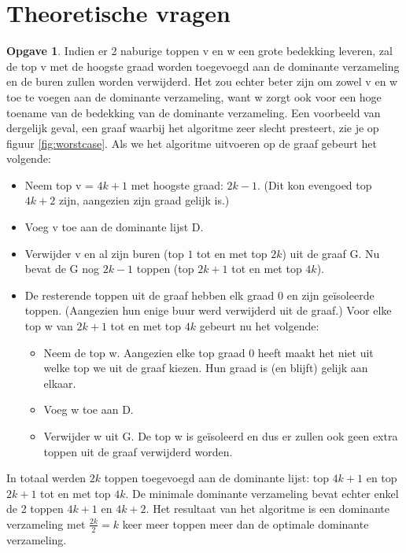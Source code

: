 \documentclass[11pt, a4paper, table]{article}
\theoremstyle{definition}
\newtheorem{opgave}{Opgave}
\theoremstyle{definition}
\theoremstyle{definition}
\begin{document}
\section{Theoretische vragen}
\begin{opgave}
	Indien er 2 naburige toppen v en w een grote bedekking leveren, zal de top v met de hoogste graad worden toegevoegd aan de dominante verzameling en de buren zullen worden verwijderd. Het zou echter beter zijn om zowel v en w toe te voegen aan de dominante verzameling, want w zorgt ook voor een hoge toename van de bedekking van de dominante verzameling. 
	Een voorbeeld van dergelijk geval, een graaf waarbij het algoritme zeer slecht presteert, zie je op figuur \ref{fig:worstcase}. Als we het algoritme uitvoeren op de graaf gebeurt het volgende:
	\begin{itemize}
		\item Neem top v = $4k+1$ met hoogste graad: $2k-1$. (Dit kon evengoed top $4k+2$ zijn, aangezien zijn graad gelijk is.)
		\item Voeg v toe aan de dominante lijst D. 
		\item Verwijder v en al zijn buren (top $1$ tot en met top $2k$) uit de graaf G. Nu bevat de G nog $2k-1$ toppen (top $2k+1$ tot en met top $4k$).
		\item De resterende toppen uit de graaf hebben elk graad 0 en zijn ge\"{i}soleerde toppen. (Aangezien hun enige buur werd verwijderd uit de graaf.) Voor elke top w van $2k+1$ tot en met top $4k$ gebeurt nu het volgende:
		\begin{itemize}
			\item Neem de top w. Aangezien elke top graad 0 heeft maakt het niet uit welke top we uit de graaf kiezen. Hun graad is (en blijft) gelijk aan elkaar. 
			\item Voeg w toe aan D. 
			\item Verwijder w uit G. De top w is ge\"{i}soleerd en dus er zullen ook geen extra toppen uit de graaf verwijderd worden. 
		\end{itemize}
	\end{itemize}
	In totaal werden $2k$ toppen toegevoegd aan de dominante lijst: top $4k+1$ en top $2k+1$ tot en met top $4k$. De minimale dominante verzameling bevat echter enkel de 2 toppen $4k+1$ en $4k+2$. 
	Het resultaat van het algoritme is een dominante verzameling met $\frac{2k}{2}=k$ keer meer toppen meer dan de optimale dominante verzameling. 
	\begin{figure}[H]
\end{figure}
\end{opgave}
\end{document}
